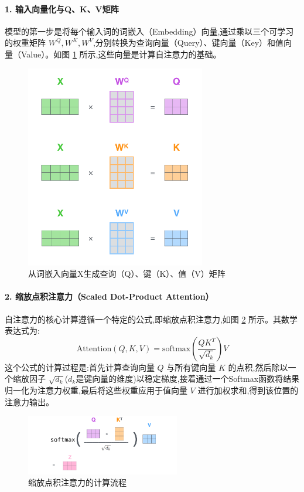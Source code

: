 \paragraph{1. 输入向量化与Q、K、V矩阵}
模型的第一步是将每个输入词的词嵌入（Embedding）向量,通过乘以三个可学习的权重矩阵 $W^Q, W^K, W^V$,分别转换为查询向量（Query）、键向量（Key）和值向量（Value）。如图 \ref{fig:qkv_creation} 所示,这些向量是计算自注意力的基础。
\begin{figure}[H]
    \centering
    \includegraphics[width=0.7\textwidth]{figures/T1.png}
    \caption{从词嵌入向量X生成查询（Q）、键（K）、值（V）矩阵}
    \label{fig:qkv_creation}
\end{figure}

\paragraph{2. 缩放点积注意力（Scaled Dot-Product Attention）}
自注意力的核心计算遵循一个特定的公式,即缩放点积注意力,如图 \ref{fig:scaled_dot_product} 所示。其数学表达式为:
$$ \text{Attention}(Q, K, V) = \text{softmax}\left(\frac{QK^T}{\sqrt{d_k}}\right)V $$
这个公式的计算过程是:首先计算查询向量 $Q$ 与所有键向量 $K$ 的点积,然后除以一个缩放因子 $\sqrt{d_k}$($d_k$是键向量的维度)以稳定梯度,接着通过一个Softmax函数将结果归一化为注意力权重,最后将这些权重应用于值向量 $V$ 进行加权求和,得到该位置的注意力输出。
\begin{figure}[H]
    \centering
    \includegraphics[width=0.6\textwidth]{figures/T2.png}
    \caption{缩放点积注意力的计算流程}
    \label{fig:scaled_dot_product}
\end{figure}


